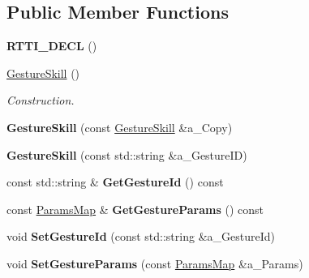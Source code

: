 \subsection*{Public Member Functions}
\begin{DoxyCompactItemize}
\item 
\mbox{\label{class_gesture_skill_af813f9000835a90a5f913a68224eafb7}} 
{\bfseries R\+T\+T\+I\+\_\+\+D\+E\+CL} ()
\item 
\mbox{\label{class_gesture_skill_a3ed1fb78c858d9f70ac8b0e894c345d4}} 
\hyperlink{class_gesture_skill_a3ed1fb78c858d9f70ac8b0e894c345d4}{Gesture\+Skill} ()
\begin{DoxyCompactList}\small\item\em Construction. \end{DoxyCompactList}\item 
\mbox{\label{class_gesture_skill_ae47ed58380ac3ba82edc622ffc20e053}} 
{\bfseries Gesture\+Skill} (const \hyperlink{class_gesture_skill}{Gesture\+Skill} \&a\+\_\+\+Copy)
\item 
\mbox{\label{class_gesture_skill_a54bcd1b0b3901d98aaae29262decae25}} 
{\bfseries Gesture\+Skill} (const std\+::string \&a\+\_\+\+Gesture\+ID)
\item 
\mbox{\label{class_gesture_skill_ae5e37990e118acf550a1091fb96efb1e}} 
const std\+::string \& {\bfseries Get\+Gesture\+Id} () const
\item 
\mbox{\label{class_gesture_skill_a0b60ccdba1e8bacc76d135a021b08839}} 
const \hyperlink{class_params_map}{Params\+Map} \& {\bfseries Get\+Gesture\+Params} () const
\item 
\mbox{\label{class_gesture_skill_aef9c81c6b8c4cd3d6907319f6abfb056}} 
void {\bfseries Set\+Gesture\+Id} (const std\+::string \&a\+\_\+\+Gesture\+Id)
\item 
\mbox{\label{class_gesture_skill_a18c845d82e55043b612e1a52e8cd5bfb}} 
void {\bfseries Set\+Gesture\+Params} (const \hyperlink{class_params_map}{Params\+Map} \&a\+\_\+\+Params)
\item 

\end{DoxyCompactItemize}
